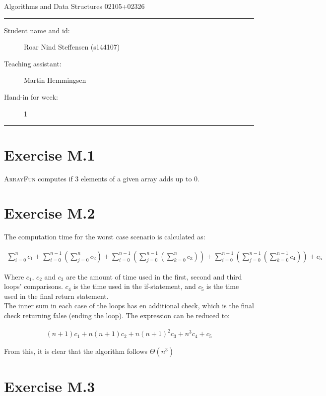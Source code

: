 \documentclass[11pt]{article}
\begin{document}
\begin{center}
{{\Large \sc Algorithms and Data Structures 02105+02326}}
\end{center}
\rule{\textwidth}{1pt}
\begin{description}
\item[Student name and id:] Roar Nind Steffensen (s144107)
\item[Teaching assistant:] Martin Hemmingsen
\item[Hand-in for week:] 1
\end{description}
\rule{\textwidth}{1pt}
 

\section*{Exercise M.1}
\textsc{ArrayFun} computes if 3 elements of a given array adds up to 0.

\section*{Exercise M.2}
The computation time for the worst case scenario is calculated as:

\begin{gather*}
\sum_{i=0}^{n}c_1 + \sum_{i=0}^{n-1}\left(\sum_{j=0}^{n}c_2\right) + \sum_{i=0}^{n-1}\left(\sum_{j=0}^{n-1}\left(\sum_{k=0}^{n}c_3\right)\right) + \sum_{i=0}^{n-1}\left(\sum_{j=0}^{n-1}\left(\sum_{k=0}^{n-1}c_4\right)\right) + c_5
\end{gather*}

Where $c_1$, $c_2$ and $c_3$ are the amount of time used in the first, second and third loops' comparisons. $c_4$ is the time used in the if-statement, and $c_5$ is the time used in the final return statement. \\

The inner sum in each case of the loops has en additional check, which is the final check returning false (ending the loop). The expression can be reduced to:

\begin{gather*}
    (n+1)c_1 + n(n+1)c_2 + n(n+1)^2c_3 + n^3c_4 + c_5 
\end{gather*}



From this, it is clear that the algorithm follows $\Theta(n^3)$

\section*{Exercise M.3}
\end{document}

